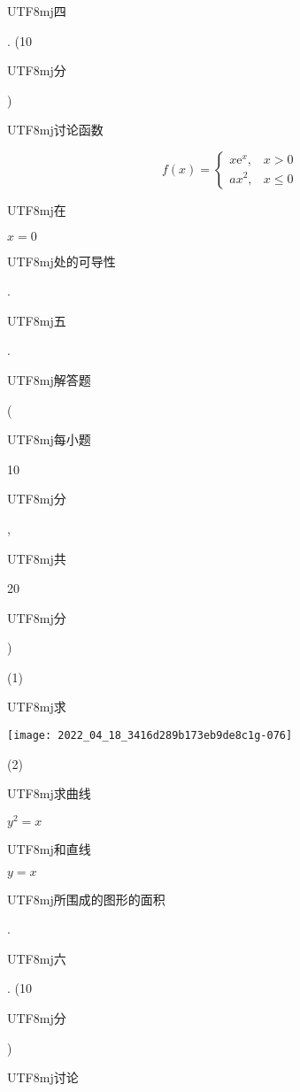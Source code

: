 \documentclass[10pt]{article}
\begin{document}
\begin{CJK}{UTF8}{mj}四\end{CJK}. (10 \begin{CJK}{UTF8}{mj}分\end{CJK}) \begin{CJK}{UTF8}{mj}讨论函数\end{CJK}
$$
f(x)= \begin{cases}x \mathrm{e}^{x}, & x>0 \\ a x^{2}, & x \leqslant 0\end{cases}
$$
\begin{CJK}{UTF8}{mj}在\end{CJK} $x=0$ \begin{CJK}{UTF8}{mj}处的可导性\end{CJK}.

\begin{CJK}{UTF8}{mj}五\end{CJK}. \begin{CJK}{UTF8}{mj}解答题\end{CJK} (\begin{CJK}{UTF8}{mj}每小题\end{CJK} 10 \begin{CJK}{UTF8}{mj}分\end{CJK}, \begin{CJK}{UTF8}{mj}共\end{CJK} 20 \begin{CJK}{UTF8}{mj}分\end{CJK})

(1) \begin{CJK}{UTF8}{mj}求\end{CJK}

\texttt{[image: 2022\_04\_18\_3416d289b173eb9de8c1g-076]}

(2) \begin{CJK}{UTF8}{mj}求曲线\end{CJK} $y^{2}=x$ \begin{CJK}{UTF8}{mj}和直线\end{CJK} $y=x$ \begin{CJK}{UTF8}{mj}所围成的图形的面积\end{CJK}.

\begin{CJK}{UTF8}{mj}六\end{CJK}. (10 \begin{CJK}{UTF8}{mj}分\end{CJK}) \begin{CJK}{UTF8}{mj}讨论\end{CJK}
\end{document}
